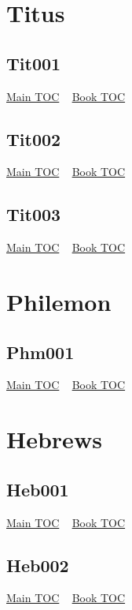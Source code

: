 \documentclass{book}
\begin{document}
  \chapter{Titus} \label{subsec:Tit} \begin{multicols}{2} \minitoc \end{multicols}
  \section{Tit001}\hyperlink{toc}{Main TOC} ~ \hyperref[subsec:Tit]{Book TOC} 
  \section{Tit002}\hyperlink{toc}{Main TOC} ~ \hyperref[subsec:Tit]{Book TOC} 
  \section{Tit003}\hyperlink{toc}{Main TOC} ~ \hyperref[subsec:Tit]{Book TOC} 
  \chapter{Philemon} \label{subsec:Phm} \begin{multicols}{2} \minitoc \end{multicols}
  \section{Phm001}\hyperlink{toc}{Main TOC} ~ \hyperref[subsec:Phm]{Book TOC} 
  \chapter{Hebrews} \label{subsec:Heb} \begin{multicols}{2} \minitoc \end{multicols}
  \section{Heb001}\hyperlink{toc}{Main TOC} ~ \hyperref[subsec:Heb]{Book TOC} 
  \section{Heb002}\hyperlink{toc}{Main TOC} ~ \hyperref[subsec:Heb]{Book TOC} 
\end{document}
